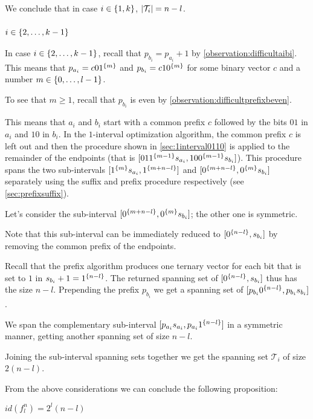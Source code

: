 We conclude that in case $i \in \{1, k\}$,
$\lvert\mathcal{T}_i\rvert = n-l$.

\subsubsection{$i \in \{2, \ldots, k-1\}$}

In case $i \in \{2, \ldots, k-1\}$,
recall that $p_{b_i} = p_{a_i} + 1$
by \cref{observation:difficultaibi}.
This means that $p_{a_i} = c 0 1^{\{m\}}$
and $p_{b_i} = c 1 0^{\{m\}}$
for some binary vector $c$
and a number $m \in \{0, \ldots, l-1\}$.

To see that $m \geq 1$,
recall that $p_{b_i}$ is even
by \cref{observation:difficultprefixbeven}.

This means that $a_i$ and $b_i$
start with a common prefix $c$
followed by the bits $01$ in $a_i$
and $10$ in $b_i$.
In the $1$-interval optimization algorithm,
the common prefix $c$ is left out
and then the procedure
shown in \cref{sec:1interval0110}
is applied to the remainder of the endpoints
(that is
$[01 1^{\{m-1\}} s_{a_i}, 10 0^{\{m-1\}} s_{b_i}]$).
This procedure spans the two sub-intervals
$[1^{\{m\}} s_{a_i}, 1^{\{m+n-l\}}]$
and $[0^{\{m+n-l\}}, 0^{\{m\}} s_{b_i}]$
separately using the suffix and prefix procedure
respectively
(see \cref{sec:prefixsuffix}).

Let's consider the sub-interval
$[0^{\{m+n-l\}}, 0^{\{m\}} s_{b_i}]$;
the other one is symmetric.

Note that this sub-interval can be immediately reduced
to $[0^{\{n-l\}}, s_{b_i}]$
by removing the common prefix of the endpoints.

Recall that the prefix algorithm
produces one ternary vector
for each bit that is set to $1$
in $s_{b_i} + 1 = 1^{\{n-l\}}$.
The returned spanning set of
$[0^{\{n-l\}}, s_{b_i}]$
thus has the size $n-l$.
Prepending the prefix $p_{b_i}$
we get a spanning set of
$[p_{b_i} 0^{\{n-l\}}, p_{b_i} s_{b_i}]$.

We span the complementary sub-interval
$[p_{a_i} s_{a_i}, p_{a_i} 1^{\{n-l\}}]$
in a symmetric manner,
getting another spanning set of size $n-l$.

Joining the sub-interval spanning sets together
we get the spanning set $\mathcal{T}_i$ of size $2(n-l)$.

\hfill

From the above considerations
we can conclude the following proposition:
\begin{lemma}
\label{lemma:difficultid}
$\mathit{id}(f_l^n) = 2^l(n-l)$
\end{lemma}

